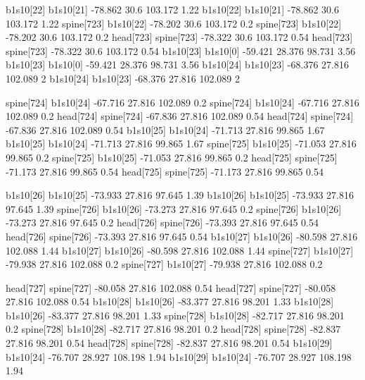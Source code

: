 b1s10[22]    b1s10[21]    -78.862    30.6    103.172    1.22
b1s10[22]    b1s10[21]    -78.862    30.6    103.172    1.22
spine[723]    b1s10[22]    -78.202    30.6    103.172    0.2
spine[723]    b1s10[22]    -78.202    30.6    103.172    0.2
head[723]    spine[723]    -78.322    30.6    103.172    0.54
head[723]    spine[723]    -78.322    30.6    103.172    0.54
b1s10[23]    b1s10[0]    -59.421    28.376    98.731    3.56
b1s10[23]    b1s10[0]    -59.421    28.376    98.731    3.56
b1s10[24]    b1s10[23]    -68.376    27.816    102.089    2
b1s10[24]    b1s10[23]    -68.376    27.816    102.089    2


spine[724]    b1s10[24]    -67.716    27.816    102.089    0.2
spine[724]    b1s10[24]    -67.716    27.816    102.089    0.2
head[724]    spine[724]    -67.836    27.816    102.089    0.54
head[724]    spine[724]    -67.836    27.816    102.089    0.54
b1s10[25]    b1s10[24]    -71.713    27.816    99.865    1.67
b1s10[25]    b1s10[24]    -71.713    27.816    99.865    1.67
spine[725]    b1s10[25]    -71.053    27.816    99.865    0.2
spine[725]    b1s10[25]    -71.053    27.816    99.865    0.2
head[725]    spine[725]    -71.173    27.816    99.865    0.54
head[725]    spine[725]    -71.173    27.816    99.865    0.54


b1s10[26]    b1s10[25]    -73.933    27.816    97.645    1.39
b1s10[26]    b1s10[25]    -73.933    27.816    97.645    1.39
spine[726]    b1s10[26]    -73.273    27.816    97.645    0.2
spine[726]    b1s10[26]    -73.273    27.816    97.645    0.2
head[726]    spine[726]    -73.393    27.816    97.645    0.54
head[726]    spine[726]    -73.393    27.816    97.645    0.54
b1s10[27]    b1s10[26]    -80.598    27.816    102.088    1.44
b1s10[27]    b1s10[26]    -80.598    27.816    102.088    1.44
spine[727]    b1s10[27]    -79.938    27.816    102.088    0.2
spine[727]    b1s10[27]    -79.938    27.816    102.088    0.2


head[727]    spine[727]    -80.058    27.816    102.088    0.54
head[727]    spine[727]    -80.058    27.816    102.088    0.54
b1s10[28]    b1s10[26]    -83.377    27.816    98.201    1.33
b1s10[28]    b1s10[26]    -83.377    27.816    98.201    1.33
spine[728]    b1s10[28]    -82.717    27.816    98.201    0.2
spine[728]    b1s10[28]    -82.717    27.816    98.201    0.2
head[728]    spine[728]    -82.837    27.816    98.201    0.54
head[728]    spine[728]    -82.837    27.816    98.201    0.54
b1s10[29]    b1s10[24]    -76.707    28.927    108.198    1.94
b1s10[29]    b1s10[24]    -76.707    28.927    108.198    1.94


